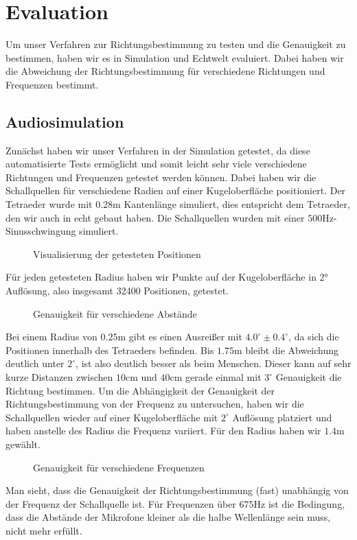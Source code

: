 \section{Evaluation}
Um unser Verfahren zur Richtungsbestimmung zu testen und die Genauigkeit zu bestimmen, haben wir es in Simulation und Echtwelt evaluiert. Dabei haben wir die Abweichung der Richtungsbestimmung für verschiedene Richtungen und Frequenzen bestimmt.
\subsection{Audiosimulation}
Zunächst haben wir unser Verfahren in der Simulation getestet, da diese automatisierte Tests ermöglicht und somit leicht sehr viele verschiedene Richtungen und Frequenzen getestet werden können. Dabei haben wir die Schallquellen für verschiedene Radien auf einer Kugeloberfläche positioniert. Der Tetraeder wurde mit $0.28\mathrm{m}$ Kantenlänge simuliert, dies entspricht dem Tetraeder, den wir auch in echt gebaut haben. Die Schallquellen wurden mit einer $500\mathrm{Hz}$-Sinusschwingung simuliert.
\begin{figure}[H]
  \centering
  
  \caption{Visualisierung der getesteten Positionen}
  \label{fig:pos}
\end{figure}
Für jeden getesteten Radius haben wir Punkte auf der Kugeloberfläche in 2° Auflösung, also insgesamt 32400 Positionen, getestet.
\begin{figure}[H]
  \centering
  
  \caption{Genauigkeit für verschiedene Abstände}
  \label{fig:pos_sweep}
\end{figure}
Bei einem Radius von $0.25\mathrm{m}$ gibt es einen Ausreißer mit $4.0^\circ \pm 0.4^\circ$, da sich die Positionen innerhalb des Tetraeders befinden. Bis $1.75\mathrm{m}$ bleibt die Abweichung deutlich unter $2^\circ$, ist also deutlich besser als beim Menschen. Dieser kann auf sehr kurze Distanzen zwischen $10\mathrm{cm}$ und $40\mathrm{cm}$ gerade einmal mit $3^\circ$ Genauigkeit die Richtung bestimmen. \cite{middlebrooks1991sound}
Um die Abhängigkeit der Genauigkeit der Richtungsbestimmung von der Frequenz zu untersuchen, haben wir die Schallquellen wieder auf einer Kugeloberfläche mit $2^\circ$ Auflösung platziert und haben anstelle des Radius die Frequenz variiert. Für den Radius haben wir $1.4\mathrm{m}$ gewählt.
\begin{figure}[H]
  \centering
  
  \caption{Genauigkeit für verschiedene Frequenzen}
  \label{fig:freq_seep}
\end{figure}
Man sieht, dass die Genauigkeit der Richtungsbestimmung (fast) unabhängig von der Frequenz der Schallquelle ist. Für Frequenzen über $675\mathrm{Hz}$ ist die Bedingung, dass die Abstände der Mikrofone kleiner als die halbe Wellenlänge sein muss, nicht mehr erfüllt.
